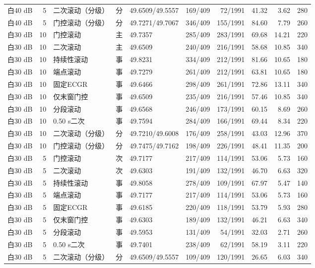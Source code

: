 \documentclass[UTF8,a4paper,11pt]{ctexart}
\begin{document}
\begin{longtable}{lrlclrrrrr}
白40 dB & 5 & 二次滚动（分级） & 分 & 49.6509/49.5557 & 169/409 & 72/1991 & 41.32 & 3.62 & 280 \\
白40 dB & 5 & 门控滚动（分级） & 分 & 49.7271/49.7067 & 346/409 & 155/1991 & 84.60 & 7.79 & 260 \\
白30 dB & 10 & 门控滚动 & 主 & 49.7357 & 285/409 & 283/1991 & 69.68 & 14.21 & 220 \\
白30 dB & 10 & 二次滚动 & 主 & 49.6509 & 240/409 & 216/1991 & 58.68 & 10.85 & 340 \\
白30 dB & 10 & 持续性滚动 & 事 & 49.8231 & 334/409 & 212/1991 & 81.66 & 10.65 & 180 \\
白30 dB & 10 & 端点滚动 & 事 & 49.7279 & 261/409 & 212/1991 & 63.81 & 10.65 & 180 \\
白30 dB & 10 & 固定ECGR & 事 & 49.6466 & 298/409 & 261/1991 & 72.86 & 13.11 & 340 \\
白30 dB & 10 & 仅末窗门控 & 事 & 49.6509 & 235/409 & 216/1991 & 57.46 & 10.85 & 340 \\
白30 dB & 10 & 分段滚动 & 事 & 49.6568 & 246/409 & 173/1991 & 60.15 & 8.69 & 260 \\
白30 dB & 10 & 0.50 s二次 & 事 & 49.7594 & 284/409 & 166/1991 & 69.44 & 8.34 & 220 \\
白30 dB & 10 & 二次滚动（分级） & 分 & 49.7210/49.6008 & 176/409 & 258/1991 & 43.03 & 12.96 & 370 \\
白30 dB & 10 & 门控滚动（分级） & 分 & 49.7475/49.7162 & 198/409 & 226/1991 & 48.41 & 11.35 & 200 \\
白30 dB & 5 & 门控滚动 & 次 & 49.7177 & 217/409 & 114/1991 & 53.06 & 5.73 & 160 \\
白30 dB & 5 & 二次滚动 & 次 & 49.6303 & 191/409 & 132/1991 & 46.70 & 6.63 & 320 \\
白30 dB & 5 & 持续性滚动 & 事 & 49.8058 & 278/409 & 109/1991 & 67.97 & 5.47 & 140 \\
白30 dB & 5 & 端点滚动 & 事 & 49.7177 & 217/409 & 114/1991 & 53.06 & 5.73 & 160 \\
白30 dB & 5 & 固定ECGR & 事 & 49.6185 & 220/409 & 118/1991 & 53.79 & 5.93 & 280 \\
白30 dB & 5 & 仅末窗门控 & 事 & 49.6303 & 189/409 & 132/1991 & 46.21 & 6.63 & 340 \\
白30 dB & 5 & 分段滚动 & 事 & 49.5953 & 131/409 & 54/1991 & 32.03 & 2.71 & 260 \\
白30 dB & 5 & 0.50 s二次 & 事 & 49.7401 & 238/409 & 62/1991 & 58.19 & 3.11 & 220 \\
白30 dB & 5 & 二次滚动（分级） & 分 & 49.6509/49.5557 & 109/409 & 120/1991 & 26.65 & 6.03 & 340 \\

\end{longtable}
\end{document}
